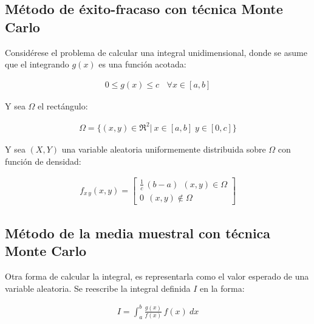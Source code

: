 \subsection{M\'etodo de \'exito-fracaso con t\'ecnica Monte Carlo}
\label{CapVII_5}

Consid\'erese el problema de calcular una integral unidimensional, donde se asume que el integrando $g(x)$ es una funci\'on acotada:

\begin{eqnarray}
 	0 \le g(x) \le c \, \; \, \; \forall x \in [a, b] \nonumber
 \label{EqZZZ12}
\end{eqnarray}


Y sea $\Omega$ el rect\'angulo:

\begin{eqnarray}
 	\Omega = \{ (x, y) \in \Re ^{2} | \: x \in [a, b] \; y \in [0, c] \} \nonumber
 \label{EqZZZ13}
\end{eqnarray}


Y sea $(X, Y)$ una variable aleatoria uniformemente distribuida sobre $\Omega$ con funci\'on de densidad:

\begin{eqnarray}
 	f_{x \, y} (x, y) =   \left[ \begin{array}{c}
                            \frac{1}{c} \, (b -a) \: \: (x, y) \in \Omega  \\
 	                    0 \: \: (x, y) \notin \Omega  \nonumber
                            \end{array} \right]
 \label{EqZZZ14}
\end{eqnarray}


\subsection{M\'etodo de la media muestral con t\'ecnica Monte Carlo}
\label{CapVII_6}

Otra forma de calcular la integral, es representarla como el valor esperado de una variable aleatoria.
%
Se reescribe la integral definida $I$ en la forma:

\begin{eqnarray}
 	I = \int _{a} ^{b} \frac{g(x)}{f(x)} \, f(x) \: dx
 \label{EqZZZ15}
\end{eqnarray}

